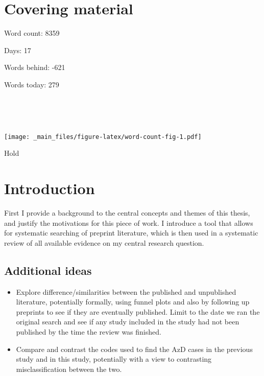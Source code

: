 \documentclass[a4paper, twoside]{templates/ociamthesis}
\providecommand{\tightlist}{%
  \setlength{\itemsep}{0pt}\setlength{\parskip}{0pt}}
\begin{document}
\flushbottom

\hypertarget{covering-material}{%
\chapter*{Covering material}\label{covering-material}}

\adjustmtc

Word count: 8359

Days: 17

Words behind: -621

Words today: 279

~

~

\texttt{[image: \_main\_files/figure-latex/word-count-fig-1.pdf]}

\begin{savequote}
Hold
\end{savequote}



\hypertarget{intro-heading}{%
\chapter{Introduction}\label{intro-heading}}

\minitoc 

First I provide a background to the central concepts and themes of this thesis, and justify the motivations for this piece of work. I introduce a tool that allows for systematic searching of preprint literature, which is then used in a systematic review of all available evidence on my central research question.

\hypertarget{additional-ideas}{%
\section{Additional ideas}\label{additional-ideas}}

\begin{itemize}
\tightlist
\item
  Explore difference/similarities between the published and unpublished literature, potentially formally, using funnel plots and also by following up preprints to see if they are eventually published. Limit to the date we ran the original search and see if any study included in the study had not been published by the time the review was finished.
\item
  Compare and contrast the codes used to find the AzD cases in the previous study and in this study, potentially with a view to contrasting misclassification between the two.
\end{itemize}
\end{document}
